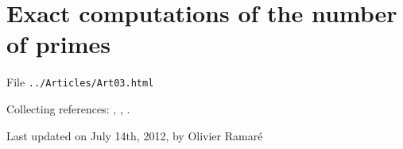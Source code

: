 \chapter{   Exact computations of the number of primes}

File \texttt{../Articles/Art03.html}









Collecting references:
\cite{Deleglise-Rivat*96-1},
\cite{Deleglise-Rivat*98},
\cite{Platt*11}.




 
 







  
  Last updated on July 14th, 2012, by Olivier Ramar\'e

















